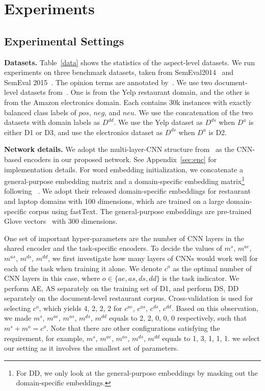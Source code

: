 \documentclass[11pt,a4paper]{article}
\begin{document}
\section{Experiments}
\subsection{Experimental Settings}
\textbf{Datasets.} Table~\ref{data} shows the statistics of the aspect-level datasets. We run experiments on three benchmark datasets, taken from SemEval2014~\citep{Pontiki:14} and SemEval 2015~\citep{Pontiki:15}. The opinion terms are annotated by~\citet{Wang:16b}. We use two document-level datasets from~\citep{He:18}. One is from the Yelp restaurant domain, and the other is from the Amazon electronics domain. Each contains 30k instances with exactly balanced class labels of $pos$, $neg$, and $neu$. We use the concatenation of the two datasets with domain labels as $D^{dd}$. We use the Yelp dataset as $D^{ds}$ when $D^{a}$ is either D1 or D3, and use the electronics dataset as $D^{ds}$ when $D^{a}$ is D2.
\medskip

\noindent\textbf{Network details.} We adopt the multi-layer-CNN structure from~\citep{hu:18} as the CNN-based encoders in our proposed network. See Appendix~\ref{sec:enc} for implementation details.  
For word embedding initialization, we concatenate a general-purpose embedding matrix and a domain-specific embedding matrix\footnote{For DD, we only look at the general-purpose embeddings by masking out the domain-specific embeddings.} following ~\citep{hu:18}. We adopt their released domain-specific embeddings for restaurant and laptop domains with 100 dimensions, which are trained on a large domain-specific corpus using fastText. The general-purpose embeddings are pre-trained Glove vectors~\citep{Pennington:14} with 300 dimensions. 

One set of important hyper-parameters are the number of CNN layers in the shared encoder and the task-specific encoders. To decide the values of $m^{s}$, $m^{ae}$, $m^{as}$, $m^{ds}$, $m^{dd}$, we first investigate how many layers of CNNs would work well for each of the task when training it alone. We denote $c^{o}$ as the optimal number of CNN layers in this case, where $o \in \{ae, as, ds, dd\}$ is the task indicator. We perform AE, AS separately on the training set of D1, and perform DS, DD separately on the document-level restaurant corpus. Cross-validation is used for selecting $c^{o}$, which yields 4, 2, 2, 2 for $c^{ae}$, $c^{as}$, $c^{ds}$, $c^{dd}$. Based on this observation, we made $m^{s}$, $m^{ae}$, $m^{as}$, $m^{ds}$, $m^{dd}$ equals to 2, 2, 0, 0, 0 respectively, such that $m^{s}+m^{o}=c^{o}$. Note that there are other configurations satisfying the requirement, for example, $m^{s}$, $m^{ae}$, $m^{as}$, $m^{ds}$, $m^{dd}$ equals to 1, 3, 1, 1, 1. we select our setting as it involves the smallest set of parameters. 
\end{document}
